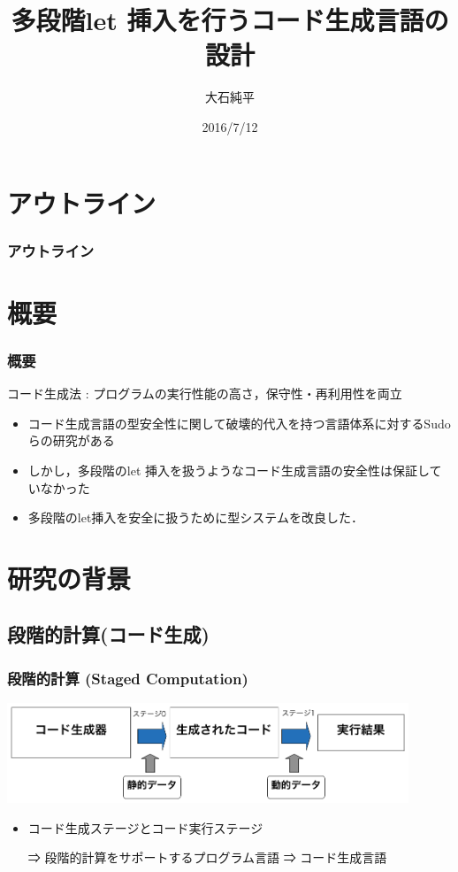 \documentclass[dvipdfmx,cjk,xcolor=dvipsnames,envcountsect,notheorems,12pt]{beamer}
\title{多段階let 挿入を行うコード生成言語の設計}
\author{大石純平}
\institute[筑波大学 プログラム論理研究室]{筑波大学 大学院 \\ プログラム論理研究室}%
\date{2016/7/12}
\theoremstyle{definition}
\begin{document}
\frame[plain]{\titlepage}%

\section*{アウトライン}

\begin{frame}
  \frametitle{アウトライン}
  \tableofcontents[sectionstyle=show,subsectionstyle=hide]
\end{frame}

\section{概要}
\begin{frame}
  \frametitle{概要}
  コード生成法 : プログラムの実行性能の高さ，保守性・再利用性を両立
  \begin{itemize}
  \item<2-> コード生成言語の型安全性に関して破壊的代入を持つ言語体系に対するSudoらの研究がある
  \item<3-> しかし，\alert{多段階のlet 挿入}を扱うようなコード生成言語の安全性は保証していなかった
  \item<4-> [⇒] \alert{多段階のlet挿入}を安全に扱うために型システムを改良した．
  \end{itemize}
\end{frame}

\section{研究の背景}
\subsection{段階的計算(コード生成)}
\begin{frame}
  \frametitle{段階的計算 (Staged Computation)}
  \includegraphics[clip,width=12cm]{./img/prggen.png}
  \begin{itemize}
  \item コード生成ステージとコード実行ステージ
  \item[⇒] 段階的計算をサポートするプログラム言語 ⇒ コード生成言語
  \end{itemize}
\end{frame}
\end{document}
